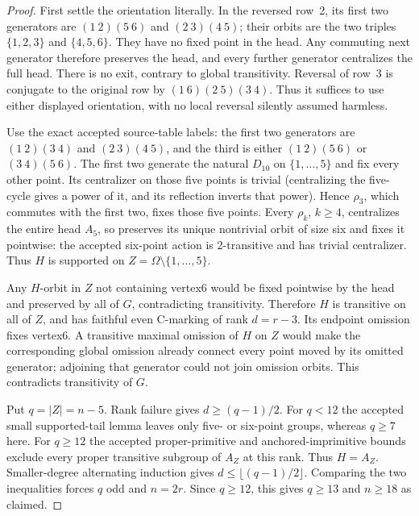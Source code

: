 \documentclass[11pt,a4paper]{article}
\begin{document}
\begin{proof}
First settle the orientation literally. In the reversed row~2, its
first two generators are $(1\ 2)(5\ 6)$ and $(2\ 3)(4\ 5)$;
their orbits are the two triples $\{1,2,3\}$ and $\{4,5,6\}$.
They have no fixed point in the head. Any commuting next generator
therefore preserves the head, and every further generator centralizes
the full head. There is no exit, contrary to global transitivity.
Reversal of row~3 is conjugate to the original row by
$(1\ 6)(2\ 5)(3\ 4)$. Thus it suffices to use either displayed
orientation, with no local reversal silently assumed harmless.

Use the exact accepted source-table labels: the first two generators
are $(1\ 2)(3\ 4)$ and $(2\ 3)(4\ 5)$, and the third is either
$(1\ 2)(5\ 6)$ or $(3\ 4)(5\ 6)$. The first two generate the
natural $D_{10}$ on $\{1,\ldots,5\}$ and fix every other point.
Its centralizer on those five points is trivial (centralizing the
five-cycle gives a power of it, and its reflection inverts that
power). Hence $\rho_3$, which commutes with the first two, fixes
those five points. Every $\rho_k$, $k\geq4$, centralizes the entire
head $A_5$, so preserves its unique nontrivial orbit of size six
and fixes it pointwise: the accepted six-point action is
2-transitive and has trivial centralizer. Thus $H$ is supported on
$Z=\Omega\setminus\{1,\ldots,5\}$.

Any $H$-orbit in $Z$ not containing vertex6 would be fixed pointwise
by the head and preserved by all of $G$, contradicting transitivity.
Therefore $H$ is transitive on all of $Z$, and has faithful even
C-marking of rank $d=r-3$. Its endpoint omission fixes vertex6.
A transitive maximal omission of $H$ on $Z$ would make the
corresponding global omission already connect every point moved
by its omitted generator; adjoining that generator could not
join omission orbits. This contradicts transitivity of $G$.

Put $q=|Z|=n-5$. Rank failure gives $d\geq(q-1)/2$.
For $q<12$ the accepted small supported-tail lemma leaves only
five- or six-point groups, whereas $q\geq7$ here. For $q\geq12$
the accepted proper-primitive and anchored-imprimitive bounds
exclude every proper transitive subgroup of $A_Z$ at this rank.
Thus $H=A_Z$. Smaller-degree alternating induction gives
$d\leq\lfloor(q-1)/2\rfloor$. Comparing the two inequalities
forces $q$ odd and $n=2r$. Since $q\geq12$, this gives $q\geq13$
and $n\geq18$ as claimed.
\end{proof}
\end{document}
